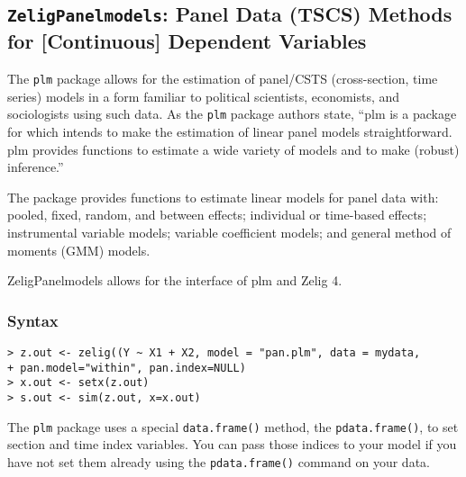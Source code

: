 \subsection{{\tt ZeligPanelmodels}: Panel Data (TSCS) Methods for [Continuous] Dependent Variables}
\label{zelig2plm}
The \texttt{plm} package allows for the estimation of panel/CSTS (cross-section, time series) models in a form familiar to political scientists, economists, and sociologists using such data. As the \texttt{plm} package authors state, ``plm is a package for \R which intends to make the estimation of linear panel models straightforward. plm provides functions to estimate a wide variety of models and to make (robust) inference.''

The package provides functions to estimate linear models for panel data with: pooled, fixed, random, and between effects; individual or time-based effects; instrumental variable models; variable coefficient models; and general method of moments (GMM) models.

ZeligPanelmodels allows for the interface of plm and Zelig 4.

\subsubsection{Syntax}
\begin{verbatim}
> z.out <- zelig((Y ~ X1 + X2, model = "pan.plm", data = mydata, 
+ pan.model="within", pan.index=NULL) 
> x.out <- setx(z.out) 
> s.out <- sim(z.out, x=x.out)
\end{verbatim}

The \texttt{plm} package uses a special \texttt{data.frame()} method, the \texttt{pdata.frame()}, to set section and time index variables. You can pass those indices to your model if you have not set them already using the \texttt{pdata.frame()} command on your data.


